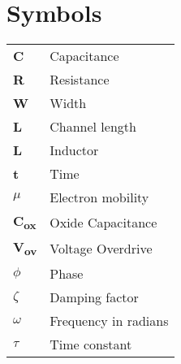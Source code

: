 \chapter*{Symbols}
\vspace{5mm}
\begin{tabular}{ll}
\textbf{C}    & Capacitance \\
\textbf{R}    & Resistance \\
\textbf{W}    & Width \\
\textbf{L}    & Channel length \\
\textbf{L}    & Inductor \\
\textbf{t}    & Time \\
\boldmath$\mu$ & Electron mobility \\
\textbf{C\textsubscript{ox}} & Oxide Capacitance \\
\textbf{V\textsubscript{ov}} & Voltage Overdrive \\
\boldmath$\phi$ & Phase \\
\boldmath$\zeta$ & Damping factor \\
\boldmath$\omega$ & Frequency in radians \\
\boldmath$\tau$ & Time constant \\
\end{tabular}